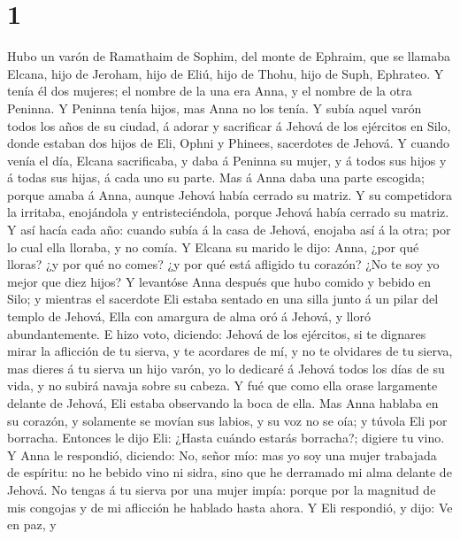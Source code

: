 \hypertarget{section}{%
\section{1}\label{section}}

 Hubo un varón de Ramathaim de Sophim, del monte de Ephraim,
que se llamaba Elcana, hijo de Jeroham, hijo de Eliú, hijo de Thohu,
hijo de Suph, Ephrateo.  Y tenía él dos mujeres; el nombre
de la una era Anna, y el nombre de la otra Peninna. Y Peninna tenía
hijos, mas Anna no los tenía.  Y subía aquel varón todos los
años de su ciudad, á adorar y sacrificar á Jehová de los ejércitos en
Silo, donde estaban dos hijos de Eli, Ophni y Phinees, sacerdotes de
Jehová.  Y cuando venía el día, Elcana sacrificaba, y daba á
Peninna su mujer, y á todos sus hijos y á todas sus hijas, á cada uno su
parte.  Mas á Anna daba una parte escogida; porque amaba á
Anna, aunque Jehová había cerrado su matriz.  Y su
competidora la irritaba, enojándola y entristeciéndola, porque Jehová
había cerrado su matriz.  Y así hacía cada año: cuando subía
á la casa de Jehová, enojaba así á la otra; por lo cual ella lloraba, y
no comía.  Y Elcana su marido le dijo: Anna, ¿por qué
lloras? ¿y por qué no comes? ¿y por qué está afligido tu corazón? ¿No te
soy yo mejor que diez hijos?  Y levantóse Anna después que
hubo comido y bebido en Silo; y mientras el sacerdote Eli estaba sentado
en una silla junto á un pilar del templo de Jehová,  Ella
con amargura de alma oró á Jehová, y lloró abundantemente. 
E hizo voto, diciendo: Jehová de los ejércitos, si te dignares mirar la
aflicción de tu sierva, y te acordares de mí, y no te olvidares de tu
sierva, mas dieres á tu sierva un hijo varón, yo lo dedicaré á Jehová
todos los días de su vida, y no subirá navaja sobre su cabeza.
 Y fué que como ella orase largamente delante de Jehová,
Eli estaba observando la boca de ella.  Mas Anna hablaba en
su corazón, y solamente se movían sus labios, y su voz no se oía; y
túvola Eli por borracha.  Entonces le dijo Eli: ¿Hasta
cuándo estarás borracha?; digiere tu vino.  Y Anna le
respondió, diciendo: No, señor mío: mas yo soy una mujer trabajada de
espíritu: no he bebido vino ni sidra, sino que he derramado mi alma
delante de Jehová.  No tengas á tu sierva por una mujer
impía: porque por la magnitud de mis congojas y de mi aflicción he
hablado hasta ahora.  Y Eli respondió, y dijo: Ve en paz, y
